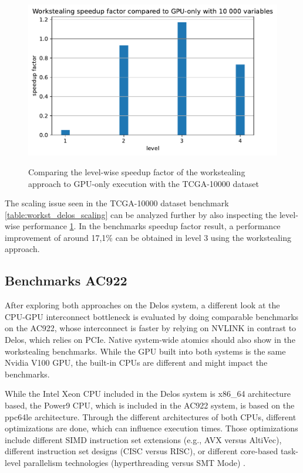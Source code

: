 \begin{figure}[H]
  \caption{Comparing the level-wise speedup factor of the workstealing approach to GPU-only execution with the TCGA-10000 dataset}
  \includegraphics[width=\textwidth]{figures/levelwise_scaled.pdf}
  \centering
  \label{fig:levelwise_scaled_delos}
\end{figure}


The scaling issue seen in the TCGA-10000 dataset benchmark \ref{table:workst_delos_scaling} can be analyzed further by also inspecting the level-wise performance \ref{fig:levelwise_scaled_delos}. In the benchmarks speedup factor result, a performance improvement of around 17,1\% can be obtained in level 3 using the workstealing approach.

\subsection{Benchmarks AC922}
After exploring both approaches on the Delos system, a different look at the CPU-GPU interconnect bottleneck is evaluated by doing comparable benchmarks on the AC922, whose interconnect is faster by relying on NVLINK in contrast to Delos, which relies on PCIe. Native system-wide atomics should also show in the workstealing benchmarks.
While the GPU built into both systems is the same Nvidia V100 GPU, the built-in CPUs are different and might impact the benchmarks.

While the Intel Xeon CPU included in the Delos system is x86\_64 architecture based, the Power9 CPU, which is included in the AC922 system, is based on the ppc64le architecture. Through the different architectures of both CPUs, different optimizations are done, which can influence execution times. Those optimizations include different SIMD instruction set extensions (e.g., AVX versus AltiVec), different instruction set designs (CISC versus RISC), or different core-based task-level parallelism technologies (hyperthreading versus SMT Mode) \cite{AnalysisX86Vs}.

